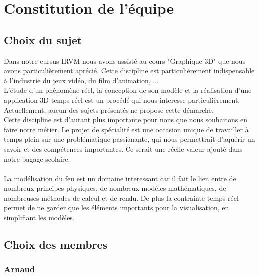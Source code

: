 \documentclass[a4paper,10pt]{article}
\begin{document}
\newpage

\tableofcontents

\newpage









\section{Constitution de l'équipe}

\subsection{Choix du sujet}

Dans notre cursus IRVM nous avons assisté au cours "Graphique 3D" que nous avons particulièrement aprécié. Cette discipline est particulièrement indispensable à l'industrie du jeux vidéo, du film d'animation, ... \\
L'étude d'un phénomène réel, la conception de son modèle et la réalisation d'une application 3D temps réel est un procédé qui nous interesse particulièrement. Actuellement, aucun des sujets présentés ne propose cette démarche.\\
Cette discipline est d'autant plus importante pour nous que nous souhaitons en faire notre métier. Le projet de spécialité est une occasion unique de travailler à temps plein sur une problématique passionante, qui nous permettrait d'aquérir un savoir et des compétences importantes. Ce serait une réelle valeur ajouté dans notre bagage scolaire.\\
~\\
La modélisation du feu est un domaine interessant car il fait le lien entre de nombreux principes physiques, de nombreux modèles mathématiques, de nombreuses méthodes de calcul et de rendu. De plus la contrainte temps réel permet de ne garder que les éléments importants pour la visualisation, en simplifiant les modèles.

\subsection{Choix des membres}
\subsubsection{Arnaud}
\end{document}
